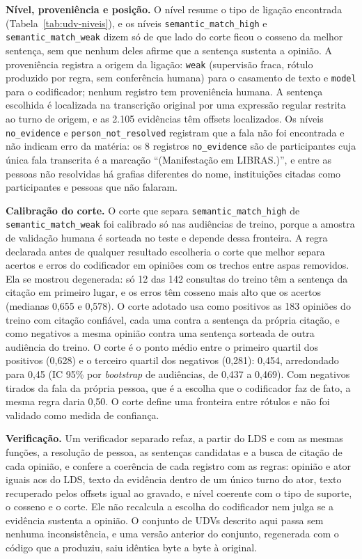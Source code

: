 \textbf{Nível, proveniência e posição.} O nível resume o tipo de ligação encontrada
(Tabela~\ref{tab:udv-niveis}), e os níveis \texttt{semantic\_match\_high} e
\texttt{semantic\_match\_weak} dizem só de que lado do corte ficou o cosseno da melhor sentença, sem
que nenhum deles afirme que a sentença sustenta a opinião. A proveniência registra a origem da ligação: \texttt{weak} (supervisão fraca,
rótulo produzido por regra, sem conferência humana) para o casamento de texto e \texttt{model} para o
codificador; nenhum registro tem proveniência humana. A sentença escolhida é localizada na transcrição
original por uma expressão regular restrita ao turno de origem, e as 2.105 evidências têm offsets
localizados. Os níveis \texttt{no\_evidence} e \texttt{person\_not\_resolved} registram que a fala não
foi encontrada e não indicam erro da matéria: os 8 registros \texttt{no\_evidence} são de participantes cuja única fala transcrita é a marcação
``(Manifestação em LIBRAS.)'', e entre as pessoas não resolvidas há grafias diferentes do nome,
instituições citadas como participantes e pessoas que não falaram.



\textbf{Calibração do corte.} O corte que separa \texttt{semantic\_match\_high} de
\texttt{semantic\_match\_weak} foi calibrado só nas audiências de treino, porque a amostra de validação
humana é sorteada no teste e depende dessa fronteira. A regra declarada antes de qualquer resultado
escolheria o corte que melhor separa acertos e erros do codificador em opiniões com os trechos entre
aspas removidos. Ela se mostrou degenerada: só 12 das 142 consultas do treino têm a sentença da
citação em primeiro lugar, e os erros têm cosseno mais alto que os acertos (medianas 0,655 e 0,578).
O corte adotado usa como positivos as 183 opiniões do treino com citação confiável, cada uma contra a
sentença da própria citação, e como negativos a mesma opinião contra uma sentença sorteada de outra
audiência do treino. O corte é o ponto médio entre o primeiro quartil dos positivos (0,628) e o
terceiro quartil dos negativos (0,281): 0,454, arredondado para 0,45 (IC 95\% por \textit{bootstrap}
de audiências, de 0,437 a 0,469). Com negativos tirados da fala da própria pessoa, que é a escolha que
o codificador faz de fato, a mesma regra daria 0,50. O corte define uma fronteira entre rótulos e não
foi validado como medida de confiança.

\textbf{Verificação.} Um verificador separado refaz, a partir do LDS e com as mesmas funções, a
resolução de pessoa, as sentenças candidatas e a busca de citação de cada opinião, e confere a
coerência de cada registro com as regras: opinião e ator iguais aos do LDS, texto da evidência dentro
de um único turno do ator, texto recuperado pelos offsets igual ao gravado, e nível coerente com o tipo
de suporte, o cosseno e o corte. Ele não recalcula a escolha do codificador nem julga se a evidência
sustenta a opinião. O conjunto de UDVs descrito aqui passa sem nenhuma inconsistência, e uma versão
anterior do conjunto, regenerada com o código que a produziu, saiu idêntica byte a byte à original.

